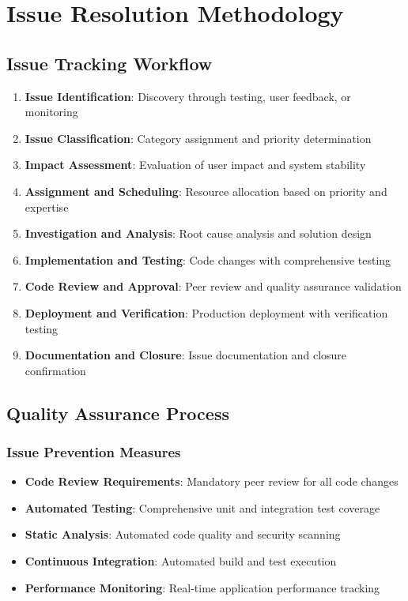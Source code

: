 \documentclass[12pt,a4paper]{article}
\begin{document}
\section{Issue Resolution Methodology}

\subsection{Issue Tracking Workflow}

\begin{enumerate}
    \item \textbf{Issue Identification}: Discovery through testing, user feedback, or monitoring
    \item \textbf{Issue Classification}: Category assignment and priority determination
    \item \textbf{Impact Assessment}: Evaluation of user impact and system stability
    \item \textbf{Assignment and Scheduling}: Resource allocation based on priority and expertise
    \item \textbf{Investigation and Analysis}: Root cause analysis and solution design
    \item \textbf{Implementation and Testing}: Code changes with comprehensive testing
    \item \textbf{Code Review and Approval}: Peer review and quality assurance validation
    \item \textbf{Deployment and Verification}: Production deployment with verification testing
    \item \textbf{Documentation and Closure}: Issue documentation and closure confirmation
\end{enumerate}

\subsection{Quality Assurance Process}

\subsubsection{Issue Prevention Measures}
\begin{itemize}
    \item \textbf{Code Review Requirements}: Mandatory peer review for all code changes
    \item \textbf{Automated Testing}: Comprehensive unit and integration test coverage
    \item \textbf{Static Analysis}: Automated code quality and security scanning
    \item \textbf{Continuous Integration}: Automated build and test execution
    \item \textbf{Performance Monitoring}: Real-time application performance tracking
\end{itemize}
\end{document}
